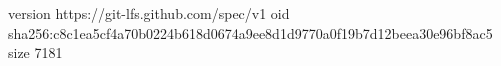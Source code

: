 version https://git-lfs.github.com/spec/v1
oid sha256:c8c1ea5cf4a70b0224b618d0674a9ee8d1d9770a0f19b7d12beea30e96bf8ac5
size 7181

